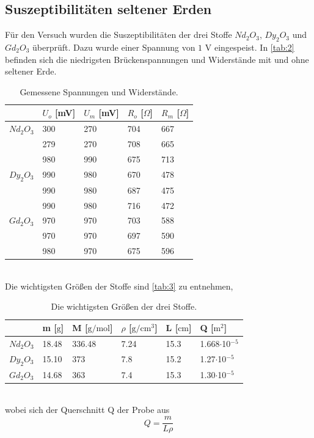 \subsection{Suszeptibilitäten seltener Erden}
Für den Versuch wurden die Suszeptibilitäten der drei Stoffe $Nd_2 O_3$, $Dy_2 O_3$ und $Gd_2 O_3$ überprüft. Dazu wurde einer Spannung von $1$ V eingespeist. In \autoref{tab:2} befinden sich die niedrigsten Brückenspannungen und Widerstände mit und ohne seltener Erde.
\begin{table}[H]
  \centering
  \caption{Gemessene Spannungen und Widerstände.}
  \begin{tabular}{l|l|l|l|l}
  & $U_{o}$ [mV] & $U_{m}$ [mV] & $R_{o}$ [$\Omega$] & $R_{m}$ [$\Omega$]\\ \hline
  $Nd_2 O_3$ & 300 & 270 & 704 & 667\\
  & 279 & 270 & 708 & 665\\
  & 980 & 990 & 675 & 713\\ \hline
  $Dy_2 O_3$ & 990 & 980 & 670 & 478\\
  & 990 & 980 & 687 & 475\\
  & 990 & 980 & 716 & 472\\ \hline
  $Gd_2 O_3$ & 970 & 970 & 703 & 588\\
  & 970 & 970 & 697 & 590\\
  & 980 & 970 & 675 & 596\\ \hline
  \end{tabular}
  \label{tab:2}
\end{table}\\
Die wichtigsten Größen der Stoffe sind \autoref{tab:3} zu entnehmen,
\begin{table}[H]
  \centering
  \caption{Die wichtigsten Größen der drei Stoffe.}
  \begin{tabular}{l|l|l|l|l|l}
  & m [$\mathrm{g}$] & M [$\mathrm{g/mol}$] & $\rho$ [$\mathrm{g/cm^3}$] & L [$\mathrm{cm}$] & Q [$\mathrm{m^2}$]\\ \hline
  $Nd_2 O_3$ & 18.48 & 336.48 & 7.24 & 15.3 & 1.668$\cdot$10$^{-5}$ \\ \hline
  $Dy_2 O_3$ & 15.10 & 373 & 7.8 & 15.2 & 1.27$\cdot$10$^{-5}$ \\ \hline
  $Gd_2 O_3$ & 14.68 & 363 & 7.4 & 15.3 & 1.30$\cdot$10$^{-5}$ \\ \hline
  \end{tabular}
  \label{tab:3}
\end{table}\\
wobei sich der Querschnitt Q der Probe aus 
\begin{equation*}
  Q=\frac{m}{L\rho}
\end{equation*}
